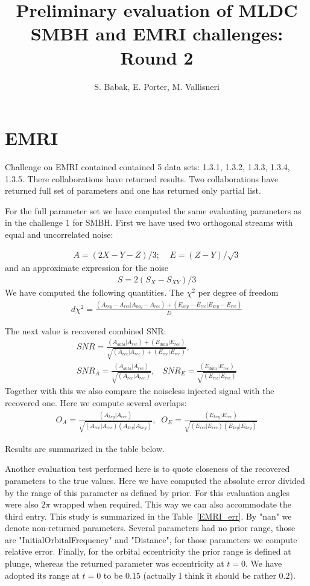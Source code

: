 \documentclass[prd,aps,amsfonts,amsmath, nofootinbib]{revtex4}
\def\bea{\begin{eqnarray}}
\def\ena{\end{eqnarray}}
\begin{document}
\title{Preliminary evaluation of MLDC SMBH and EMRI challenges: 
Round 2}
\author{S. Babak, E. Porter, M. Vallisneri}
\maketitle

\section{EMRI}

Challenge on EMRI contained contained 5 data sets: 1.3.1, 1.3.2, 1.3.3, 1.3.4, 1.3.5.
There collaborations have returned results. Two collaborations have returned full set of parameters and one has returned only partial list.

For the full parameter set we have computed the same evaluating
parameters as in the challenge 1 for SMBH.
First we have  used two orthogonal streams with equal and uncorrelated noise:

\bea
A = (2X - Y - Z)/3; \;\;\;\; E = (Z - Y)/\sqrt{3}
\ena
and an approximate expression for the noise 
\bea
S = 2(S_X - S_{XY})/3
\ena
We have computed the following quantities. The $\chi^2$ per degree
of freedom
\bea
d\chi^{2} = \frac{(A_{key}- A_{rec}|A_{key}- A_{rec}) +
(E_{key} - E_{rec}|E_{key} - E_{rec})}
{D}
\ena

The next value is recovered combined SNR:
\bea
SNR  = \frac{(A_{data}|A_{rec}) + (E_{data}|E_{rec})}
{\sqrt{(A_{rec}|A_{rec}) + (E_{rec}|E_{rec})}},\\
SNR_A = \frac{(A_{data}|A_{rec})}{\sqrt{(A_{rec}|A_{rec})}},\;\;\;
SNR_E= \frac{(E_{data}|E_{rec})}{\sqrt{(E_{rec}|E_{rec})}}
\ena
Together with this we also compare the noiseless injected signal with
the recovered one. Here we compute several overlaps:
\bea
O_A = \frac{(A_{key}|A_{rec})}{\sqrt{(A_{rec}|A_{rec})(A_{key}|A_{key})}}, \;\;
O_E = \frac{(E_{key}|E_{rec})}{\sqrt{(E_{rec}|E_{rec})(E_{key}|E_{key})}}
\ena

Results are summarized in the table below.

Another evaluation test performed here is to quote closeness
of the recovered parameters to the true values. Here we have computed
the absolute error divided by the range of this parameter as defined by
prior. For this evaluation angles were also $2\pi$ wrapped when required. This way we can also accommodate the third entry. This study is
summarized in the Table~\ref{EMRI_err}. By "nan" we denote non-returned parameters. Several parameters had no prior range, those are
"InitialOrbitalFrequency" and "Distance", for those parameters we compute relative error. Finally, for the orbital eccentricity the
prior range is defined at plunge, whereas the returned parameter
was eccentricity at $t=0$. We have adopted its range at $t=0$ to be 
$0.15$ (actually I think it should be rather $0.2$).
 
\end{document}
